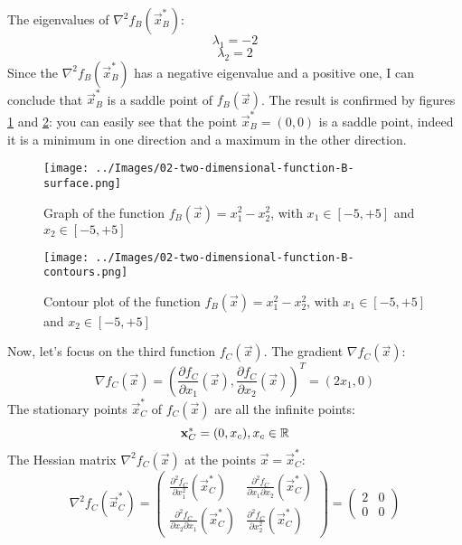     The eigenvalues of \(\nabla^2 f_B(\vec{x}^*_B)\):
    \[\lambda_1 = -2\]
    \[\lambda_2 = 2\]
    Since the \(\nabla^2 f_B(\vec{x}_B^*)\) has a negative eigenvalue and a positive one, I can conclude that \(\vec{x}^*_B\) is a saddle point of \(f_B(\vec{x})\). The result is confirmed by figures \ref{two-dimensional-function-B-surface} and \ref{two-dimensional-function-B-contours}: you can easily see that the point \(\vec{x}_B^* = (0, 0)\) is a saddle point, indeed it is a minimum in one direction and a maximum in the other direction.\par
    \begin{figure}
        \centering
        \texttt{[image: ../Images/02-two-dimensional-function-B-surface.png]}
        \caption{Graph of the function \(f_B(\vec{x}) = x_{1}^{2} - x_{2}^{2}\), with \(x_1 \in [-5, +5]\) and \(x_2 \in [-5, +5]\)}
        \label{two-dimensional-function-B-surface}
    \end{figure}
    \begin{figure}
        \centering
        \texttt{[image: ../Images/02-two-dimensional-function-B-contours.png]}
        \caption{Contour plot of the function \(f_B(\vec{x}) = x_{1}^{2} - x_{2}^{2}\), with \(x_1 \in [-5, +5]\) and \(x_2 \in [-5, +5]\)}
        \label{two-dimensional-function-B-contours}
    \end{figure}
    Now, let's focus on the third function \(f_C(\vec{x})\). The gradient \(\nabla f_C(\vec{x})\):
    \[\nabla f_C(\vec{x}) = \left (\frac{\partial f_C}{\partial x_1}(\vec{x}), \frac{\partial f_C}{\partial x_2}(\vec{x}) \right )^T = (2x_1, 0)\]
    The stationary points \(\vec{x}_C^*\) of \(f_C(\vec{x})\) are all the infinite points:
    \[\mathbf{x}_C^* = (0, x_c), x_c \in \mathbb{R}\]
    The Hessian matrix \(\nabla^2 f_C(\vec{x})\) at the points \(\vec{x} = \vec{x}_C^*\):
    \[
        \nabla^2 f_C(\vec{x}_C^*) =
        \begin{pmatrix}
            \frac{\partial^2 f_C}{\partial x_1^2}(\vec{x}^*_C) &
            \frac{\partial^2 f_C}{\partial x_1 \partial x_2}(\vec{x}^*_C) \\
            \frac{\partial^2 f_C}{\partial x_2 \partial x_1}(\vec{x}^*_C) &
            \frac{\partial^2 f_C}{\partial x_2^2}(\vec{x}^*_C)
        \end{pmatrix}
        =
        \begin{pmatrix}
            2 & 0 \\
            0 & 0
        \end{pmatrix}
    \]

